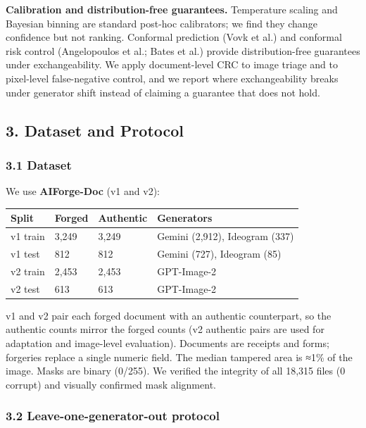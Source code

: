 \textbf{Calibration and distribution-free guarantees.} Temperature scaling and Bayesian binning are standard post-hoc calibrators; we find they change confidence but not ranking. Conformal prediction (Vovk et al.) and conformal risk control (Angelopoulos et al.; Bates et al.) provide distribution-free guarantees under exchangeability. We apply document-level CRC to image triage and to pixel-level false-negative control, and we report where exchangeability breaks under generator shift instead of claiming a guarantee that does not hold.

\subsection{3. Dataset and Protocol}\label{dataset-and-protocol}

\subsubsection{3.1 Dataset}\label{dataset}

We use \textbf{AIForge-Doc} (v1 and v2):

{\def\LTcaptype{none} %
\begin{longtable}[]{@{}llll@{}}
\toprule\noalign{}
Split & Forged & Authentic & Generators \\
\midrule\noalign{}
\endhead
\bottomrule\noalign{}
\endlastfoot
v1 train & 3,249 & 3,249 & Gemini (2,912), Ideogram (337) \\
v1 test & 812 & 812 & Gemini (727), Ideogram (85) \\
v2 train & 2,453 & 2,453 & GPT-Image-2 \\
v2 test & 613 & 613 & GPT-Image-2 \\
\end{longtable}
}

v1 and v2 pair each forged document with an authentic counterpart, so the authentic counts mirror the forged counts (v2 authentic pairs are used for adaptation and image-level evaluation). Documents are receipts and forms; forgeries replace a single numeric field. The median tampered area is ≈1\% of the image. Masks are binary (0/255). We verified the integrity of all 18,315 files (0 corrupt) and visually confirmed mask alignment.

\subsubsection{3.2 Leave-one-generator-out protocol}\label{leave-one-generator-out-protocol}

